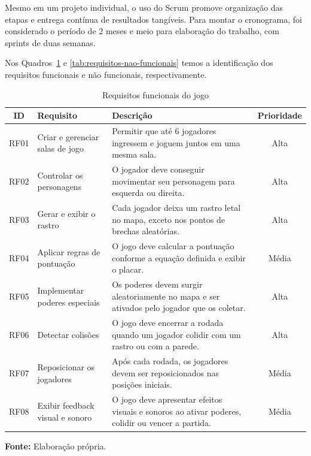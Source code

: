 Mesmo em um projeto individual, o uso do Scrum promove organização das etapas e entrega contínua de resultados tangíveis. Para montar o cronograma, foi considerado o período de 2 meses e meio para elaboração do trabalho, com sprints de duas semanas.

Nos Quadros~\ref{tab:requisitos} e \ref{tab:requisitos-nao-funcionais} temos a identificação dos requisitos funcionais e não funcionais, respectivamente.

\begin{table}[H]
\centering
\caption{Requisitos funcionais do jogo}
\label{tab:requisitos}
\begin{tabular}{|c|p{3cm}|p{7.5cm}|c|}
\hline
\textbf{ID} & \textbf{Requisito} & \textbf{Descrição} & \textbf{Prioridade} \\ \hline
RF01 & Criar e gerenciar salas de jogo & Permitir que até 6 jogadores ingressem e joguem juntos em uma mesma sala. & Alta \\ \hline
RF02 & Controlar os personagens & O jogador deve conseguir movimentar seu personagem para esquerda ou direita. & Alta \\ \hline
RF03 & Gerar e exibir o rastro & Cada jogador deixa um rastro letal no mapa, exceto nos pontos de brechas aleatórias. & Alta \\ \hline
RF04 & Aplicar regras de pontuação & O jogo deve calcular a pontuação conforme a equação definida e exibir o placar. & Média \\ \hline
RF05 & Implementar poderes especiais & Os poderes devem surgir aleatoriamente no mapa e ser ativados pelo jogador que os coletar. & Alta \\ \hline
RF06 & Detectar colisões & O jogo deve encerrar a rodada quando um jogador colidir com um rastro ou com a parede. & Alta \\ \hline
RF07 & Reposicionar os jogadores & Após cada rodada, os jogadores devem ser reposicionados nas posições iniciais. & Média \\ \hline
RF08 & Exibir feedback visual e sonoro & O jogo deve apresentar efeitos visuais e sonoros ao ativar poderes, colidir ou vencer a partida. & Média \\ \hline
\end{tabular}

\vspace{0.3em}
\small \textbf{Fonte:} Elaboração própria.
\end{table}

